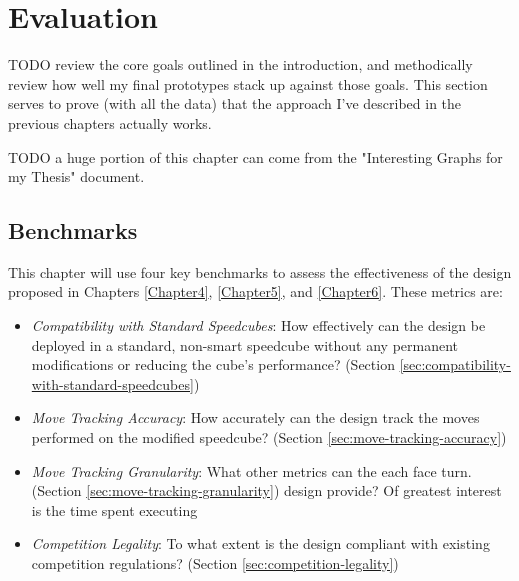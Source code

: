 
\chapter{Evaluation} %

\label{Chapter7} %

TODO review the core goals outlined in the introduction, and
methodically review how well my final prototypes stack up against those
goals. This section serves to prove (with all the data) that the
approach I've described in the previous chapters actually works.

TODO a huge portion of this chapter can come from the "Interesting
Graphs for my Thesis" document.

\section{Benchmarks}
\label{sec:evaluation-benchmarks}

This chapter will use four key benchmarks to assess the effectiveness
of the design proposed in Chapters \ref{Chapter4}, \ref{Chapter5}, and
\ref{Chapter6}. These metrics are:

\begin{itemize}

    \item \emph{Compatibility with Standard Speedcubes}: How
    effectively can the design be deployed in a standard, non-smart
    speedcube without any permanent modifications or reducing the
    cube's performance? (Section
    \ref{sec:compatibility-with-standard-speedcubes})
    
    \item \emph{Move Tracking Accuracy}: How accurately can the design
    track the moves performed on the modified speedcube? (Section
    \ref{sec:move-tracking-accuracy})
    
    \item \emph{Move Tracking Granularity}: What other metrics can the
    each face turn. (Section \ref{sec:move-tracking-granularity})
    design provide? Of greatest interest is the time spent executing
    
    \item \emph{Competition Legality}: To what extent is the design
    compliant with existing competition regulations? (Section
    \ref{sec:competition-legality})
    
\end{itemize}

